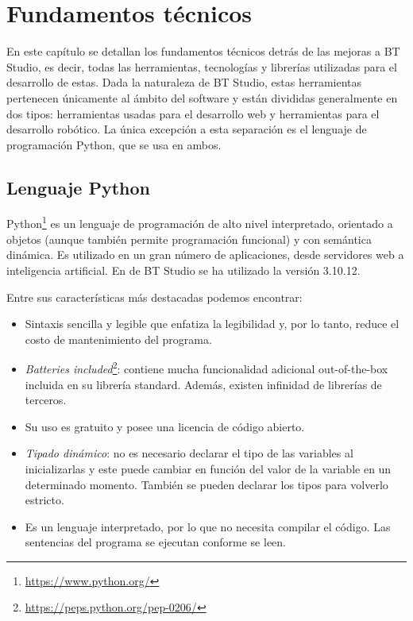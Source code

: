 \chapter{Fundamentos técnicos}\label{cap:tecnologias}

En este capítulo se detallan los fundamentos técnicos detrás de las mejoras a BT Studio, es decir, todas las herramientas, tecnologías y librerías utilizadas para el desarrollo de estas. Dada la naturaleza de BT Studio, estas herramientas pertenecen únicamente al ámbito del software y están divididas generalmente en dos tipos: herramientas usadas para el desarrollo web y herramientas para el desarrollo robótico. La única excepción a esta separación es el lenguaje de programación Python, que se usa en ambos. 

\section{Lenguaje Python}

Python\footnote{\url{https://www.python.org/}} es un lenguaje de programación de alto nivel interpretado, orientado a objetos (aunque también permite programación funcional) y con semántica dinámica. Es utilizado en un gran número de aplicaciones, desde servidores web a inteligencia artificial. 
En de BT Studio se ha utilizado la versión 3.10.12. 

Entre sus características más destacadas podemos encontrar:

\begin{itemize}
    \item Sintaxis sencilla y legible que enfatiza la legibilidad y, por lo tanto, reduce el costo de mantenimiento del programa.
    \item \textit{Batteries included}\footnote{\url{https://peps.python.org/pep-0206/}}: contiene mucha funcionalidad adicional out-of-the-box incluida en su librería standard. Además, existen infinidad de librerías de terceros. 
    \item Su uso es gratuito y posee una licencia de código abierto. 
    \item \textit{Tipado dinámico}: no es necesario declarar el tipo de las variables al inicializarlas y este puede cambiar en función del valor de la variable en un determinado momento. También se pueden declarar los tipos para volverlo estricto.
    \item Es un lenguaje interpretado, por lo que no necesita compilar el código. Las sentencias del programa se ejecutan conforme se leen. 
\end{itemize}

